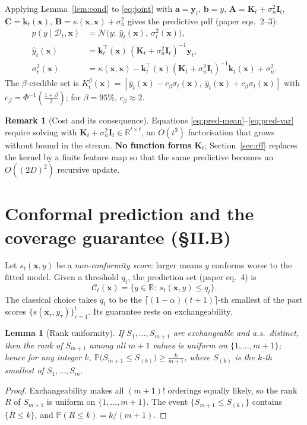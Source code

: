 \documentclass[11pt]{article}
\theoremstyle{plain}
\newtheorem{lemma}{Lemma}
\theoremstyle{definition}
\newtheorem{remark}{Remark}
\newcommand{\R}{\mathbb{R}}
\newcommand{\Prob}{\mathbb{P}}
\newcommand{\N}{\mathcal{N}}
\newcommand{\D}{\mathcal{D}}
\newcommand{\C}{\mathcal{C}}
\newcommand{\K}{\mathbf{K}}
\newcommand{\I}{\mathbf{I}}
\newcommand{\x}{\mathbf{x}}
\newcommand{\y}{\mathbf{y}}
\newcommand{\hy}{\hat{y}}
\newcommand{\sn}{\sigma_n}
\begin{document}
Applying Lemma~\ref{lem:cond} to \eqref{eq:joint} with $\mathbf a=\y_t$, $\mathbf b=y$, $\mathbf A=\K_t+\sn^2\I_t$, $\mathbf C=\mathbf k_t(\x)$, $\mathbf B=\kappa(\x,\x)+\sn^2$ gives the predictive pdf (paper eqs.~2--3):
\begin{align}
p(y\mid\D_t,\x)&=\N\big(y;\ \hy_t(\x),\ \sigma_t^2(\x)\big),\label{eq:pred}\\
\hy_t(\x)&=\mathbf k_t^\top(\x)\,(\K_t+\sn^2\I_t)^{-1}\y_t,\label{eq:pred-mean}\\
\sigma_t^2(\x)&=\kappa(\x,\x)-\mathbf k_t^\top(\x)(\K_t+\sn^2\I_t)^{-1}\mathbf k_t(\x)+\sn^2.\label{eq:pred-var}
\end{align}
The $\beta$-credible set is $K_t^\beta(\x)=[\hy_t(\x)-c_\beta\sigma_t(\x),\ \hy_t(\x)+c_\beta\sigma_t(\x)]$ with $c_\beta=\Phi^{-1}(\tfrac{1+\beta}{2})$; for $\beta=95\%$, $c_\beta\approx2$.

\begin{remark}[Cost and its consequence]
Equations \eqref{eq:pred-mean}--\eqref{eq:pred-var} require solving with $\K_t+\sn^2\I_t\in\R^{t\times t}$, an $O(t^3)$ factorisation that grows without bound in the stream. \textbf{No function forms $\K_t$}; Section~\ref{sec:rff} replaces the kernel by a finite feature map so that the same predictive becomes an $O((2D)^2)$ recursive update.
\end{remark}

\section{Conformal prediction and the coverage guarantee (\S II.B)}\label{sec:cp}
Let $s_t(\x,y)$ be a \emph{non-conformity score}: larger means $y$ conforms worse to the fitted model. Given a threshold $q_t$, the prediction set (paper eq.~4) is
\begin{equation}
\C_t(\x)=\{y\in\R:\ s_t(\x,y)\le q_t\}.
\label{eq:cpset}
\end{equation}
The classical choice takes $q_t$ to be the $\lceil(1-\alpha)(t+1)\rceil$-th smallest of the past scores $\{s(\x_\tau,y_\tau)\}_{\tau=1}^t$. Its guarantee rests on exchangeability.

\begin{lemma}[Rank uniformity]\label{lem:rank}
If $S_1,\dots,S_{m+1}$ are exchangeable and a.s.\ distinct, then the rank of $S_{m+1}$ among all $m+1$ values is uniform on $\{1,\dots,m+1\}$; hence for any integer $k$, $\Prob\big(S_{m+1}\le S_{(k)}\big)\ge \tfrac{k}{m+1}$, where $S_{(k)}$ is the $k$-th smallest of $S_1,\dots,S_m$.
\end{lemma}
\begin{proof}
Exchangeability makes all $(m+1)!$ orderings equally likely, so the rank $R$ of $S_{m+1}$ is uniform on $\{1,\dots,m+1\}$. The event $\{S_{m+1}\le S_{(k)}\}$ contains $\{R\le k\}$, and $\Prob(R\le k)=k/(m+1)$.
\end{proof}
\end{document}
